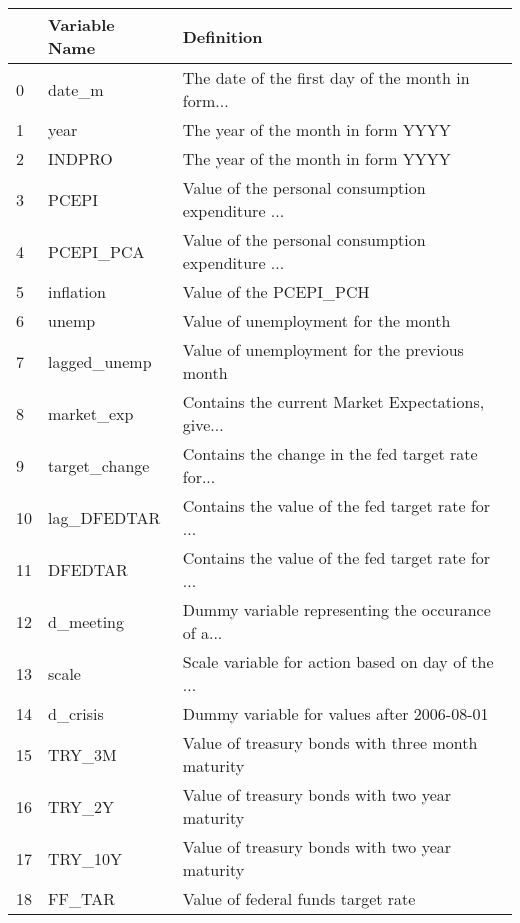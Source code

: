\begin{tabular}{lll}
\toprule
{} &              Variable Name &                                         Definition \\
\midrule
0   &                     date\_m &  The date of the first day of the month in form... \\
1   &                       year &                 The year of the month in form YYYY \\
2   &                     INDPRO &                 The year of the month in form YYYY \\
3   &                      PCEPI &  Value of the personal consumption expenditure ... \\
4   &                  PCEPI\_PCA &  Value of the personal consumption expenditure ... \\
5   &                  inflation &                             Value of the PCEPI\_PCH \\
6   &                      unemp &                Value of unemployment for the month \\
7   &               lagged\_unemp &       Value of unemployment for the previous month \\
8   &                 market\_exp &  Contains the current Market Expectations, give... \\
9   &              target\_change &  Contains the change in the fed target rate for... \\
10  &                lag\_DFEDTAR &  Contains the value of the fed target rate for ... \\
11  &                    DFEDTAR &  Contains the value of the fed target rate for ... \\
12  &                  d\_meeting &  Dummy variable representing the occurance of a... \\
13  &                      scale &  Scale variable for action based on day of the ... \\
14  &                   d\_crisis &         Dummy variable for values after 2006-08-01 \\
15  &                     TRY\_3M &  Value of treasury bonds with three month maturity \\
16  &                     TRY\_2Y &     Value of treasury bonds with two year maturity \\
17  &                    TRY\_10Y &     Value of treasury bonds with two year maturity \\
18  &                     FF\_TAR &                 Value of federal funds target rate \\

\end{tabular}
